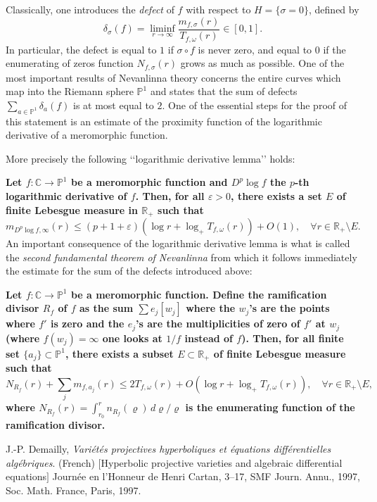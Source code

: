 \documentclass[12pt]{article}
\begin{document}
Classically, one introduces the \emph{defect} of $f$ with respect to $H=\{\sigma=0\}$, defined by
$$
\delta_\sigma(f)=\liminf_{r\to\infty}\frac{m_{f,\sigma}(r)}{T_{f,\omega}(r)}\in[0,1].
$$
In particular, the defect is equal to $1$ if $\sigma\circ f$ is never zero, and equal to $0$ if the enumerating of zeros function $N_{f,\sigma}(r)$ grows as much as possible. One of the most important results of Nevanlinna theory concerns the entire curves which map into the Riemann sphere $\mathbb P^1$ and states that the sum of defects $\sum_{a\in\mathbb P^1}\delta_a(f)$ is at most equal to $2$. One of the essential steps for the proof of this statement is an estimate of the proximity function of the logarithmic derivative of a meromorphic function. 

More precisely the following \lq\lq logarithmic derivative lemma\rq\rq{} holds:

{\bf Let $f\colon\mathbb C\to\mathbb P^1$ be a meromorphic function and $D^p\log f$ the $p$-th logarithmic derivative of $f$. Then, for all $\varepsilon>0$, there exists a set $E$ of finite Lebesgue measure in $\mathbb R_+$ such that
$$
m_{D^p\log f,\infty}(r)\le(p+1+\varepsilon)(\log r+\log_+T_{f,\omega}(r))+O(1),\quad\forall r\in\mathbb R_+\setminus E.
$$}
An important consequence of the logarithmic derivative lemma is what is called the \emph{second fundamental theorem of Nevanlinna} from which it follows immediately the estimate for the sum of the defects introduced above:

{\bf Let $f\colon\mathbb C\to\mathbb P^1$ be a meromorphic function. Define the ramification divisor $R_f$ of $f$ as the sum $\sum e_j[w_j]$ where the $w_j$'s are the points where $f'$ is zero and the $e_j$'s are the multiplicities of zero of $f'$ at $w_j$ (where $f(w_j)=\infty$ one looks at $1/f$ instead of $f$). Then, for all finite set $\{a_j\}\subset\mathbb P^1$, there exists a subset $E\subset\mathbb R_+$ of finite Lebesgue measure such that
$$
N_{R_f}(r)+\sum_j m_{f,a_j}(r)\le 2T_{f,\omega}(r)+O(\log r+\log_+T_{f,\omega}(r)),\quad\forall r\in\mathbb R_+\setminus E,
$$
where $N_{R_f}(r)=\int_{r_0}^rn_{R_f}(\varrho)\,d\varrho/\varrho$ is the enumerating function of the ramification divisor.}

\begin{thebibliography}
{}J.-P. Demailly, \emph{Vari\'et\'es projectives hyperboliques et \'equations diff\'erentielles alg\'ebriques}. (French) $\lbrack$Hyperbolic projective varieties and algebraic differential equations$\rbrack$ Journ\'ee en l'Honneur de Henri Cartan,  3--17, SMF Journ. Annu., 1997, Soc. Math. France, Paris, 1997.
\end{thebibliography}
\end{document}

